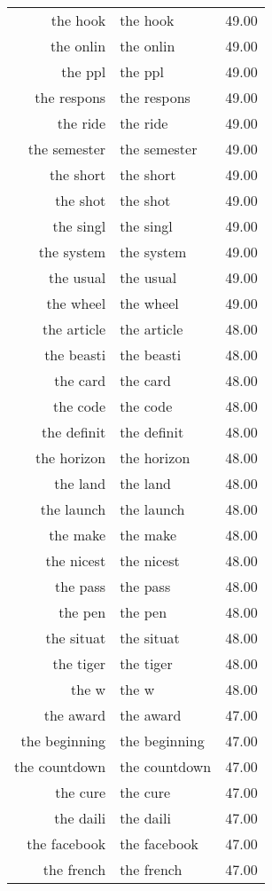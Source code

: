 \begin{table}[ht]
\begin{tabular}{rlr}
  the hook & the hook & 49.00 \\ 
  the onlin & the onlin & 49.00 \\ 
  the ppl & the ppl & 49.00 \\ 
  the respons & the respons & 49.00 \\ 
  the ride & the ride & 49.00 \\ 
  the semester & the semester & 49.00 \\ 
  the short & the short & 49.00 \\ 
  the shot & the shot & 49.00 \\ 
  the singl & the singl & 49.00 \\ 
  the system & the system & 49.00 \\ 
  the usual & the usual & 49.00 \\ 
  the wheel & the wheel & 49.00 \\ 
  the article & the article & 48.00 \\ 
  the beasti & the beasti & 48.00 \\ 
  the card & the card & 48.00 \\ 
  the code & the code & 48.00 \\ 
  the definit & the definit & 48.00 \\ 
  the horizon & the horizon & 48.00 \\ 
  the land & the land & 48.00 \\ 
  the launch & the launch & 48.00 \\ 
  the make & the make & 48.00 \\ 
  the nicest & the nicest & 48.00 \\ 
  the pass & the pass & 48.00 \\ 
  the pen & the pen & 48.00 \\ 
  the situat & the situat & 48.00 \\ 
  the tiger & the tiger & 48.00 \\ 
  the w & the w & 48.00 \\ 
  the award & the award & 47.00 \\ 
  the beginning & the beginning & 47.00 \\ 
  the countdown & the countdown & 47.00 \\ 
  the cure & the cure & 47.00 \\ 
  the daili & the daili & 47.00 \\ 
  the facebook & the facebook & 47.00 \\ 
  the french & the french & 47.00 \\ 

\end{tabular}
\end{table}
